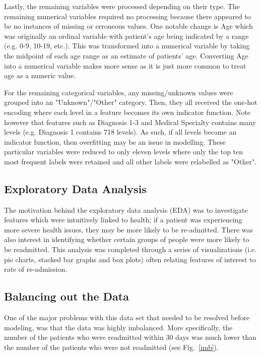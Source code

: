 \documentclass[letterpaper, 10 pt, conference]{ieeeconf}  %
\begin{document}
Lastly, the remaining variables were processed depending on their type. The remaining numerical variables required no processing because there appeared to be no instances of missing or erroneous  values. One notable change is Age which was originally an ordinal variable with patient's age being indicated by a range (e.g. 0-9, 10-19, etc.). This was transformed into a numerical variable by taking the midpoint of each age range as an estimate of patients' age. Converting Age into a numerical variable makes more sense as it is just more common to treat age as a numeric value. 

For the remaining categorical variables, any missing/unknown values were grouped into an "Unknown"/"Other" category. Then, they all received the one-hot encoding where each level in a feature becomes its own indicator function. Note however that features such as Diagnosis 1-3 and Medical Specialty contains many levels (e.g. Diagnosis 1 contains 718 levels). As such, if all levels became an indicator function, then overfitting may be an issue in modelling. These particular variables were reduced to only eleven levels where only the top ten most frequent labels were retained and all other labels were relabelled as "Other". 

\subsection{Exploratory Data Analysis}

The motivation behind the exploratory data analysis (EDA) was to investigate features which were intuitively linked to health; if a patient was experiencing more severe health issues, they may be more likely to be re-admitted. There was also interest in identifying whether certain groups of people were more likely to be readmitted. This analysis was completed through a series of visualizations (i.e. pie charts, stacked bar graphs and box plots) often relating features of interest to rate of re-admission. 

\subsection{Balancing out the Data}
One of the major problems with this data set that needed to be resolved before modeling, was that the data was highly imbalanced. More specifically, the number of the patients who were readmitted within 30 days was much lower than the number of the patients who were not readmitted (see Fig.~\ref{imb}).\\
\end{document}
